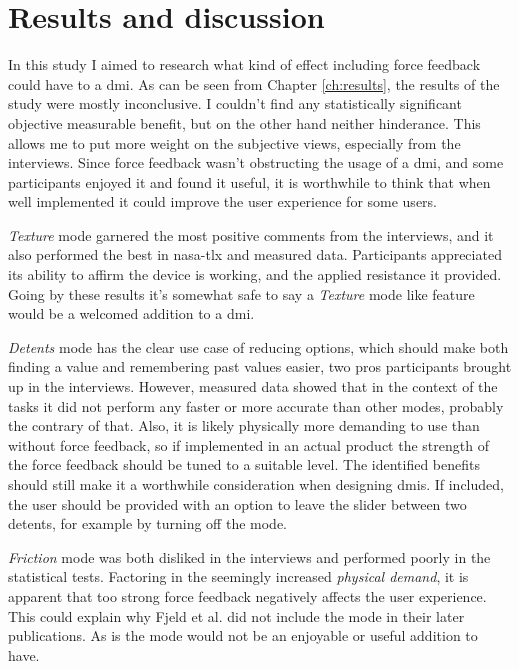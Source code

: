 \section{Results and discussion}

In this study I aimed to research what kind of effect including force feedback could have to a \gls{dmi}. As can be seen from Chapter \ref{ch:results}, the results of the study were mostly inconclusive. I couldn't find any statistically significant objective measurable benefit, but on the other hand neither hinderance. This allows me to put more weight on the subjective views, especially from the interviews. Since force feedback wasn't obstructing the usage of a \gls{dmi}, and some participants enjoyed it and found it useful, it is worthwhile to think that when well implemented it could improve the user experience for some users.

\textit{Texture} mode garnered the most positive comments from the interviews, and it also performed the best in \gls{nasa-tlx} and measured data. Participants appreciated its ability to affirm the device is working, and the applied resistance it provided. Going by these results it's somewhat safe to say a \textit{Texture} mode like feature would be a welcomed addition to a \gls{dmi}.

\textit{Detents} mode has the clear use case of reducing options, which should make both finding a value and remembering past values easier, two pros participants brought up in the interviews. However, measured data showed that in the context of the tasks it did not perform any faster or more accurate than other modes, probably the contrary of that. Also, it is likely physically more demanding to use than without force feedback, so if implemented in an actual product the strength of the force feedback should be tuned to a suitable level. The identified benefits should still make it a worthwhile consideration when designing \glspl{dmi}. If included, the user should be provided with an option to leave the slider between two detents, for example by turning off the mode.

\textit{Friction} mode was both disliked in the interviews and performed poorly in the statistical tests. Factoring in the seemingly increased \textit{physical demand}, it is apparent that too strong force feedback negatively affects the user experience. This could explain why Fjeld et al. did not include the mode in their later publications. As is the mode would not be an enjoyable or useful addition to have.

